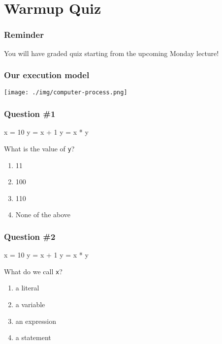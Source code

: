 \documentclass[11pt]{beamer}
\begin{document}
\section{Warmup Quiz}


\begin{frame}
	\frametitle{Reminder}
	\Enlarge
	\begin{itemize}
		\myitem  You will have graded quiz starting from the upcoming Monday lecture!
	\end{itemize}
\end{frame}




\begin{frame}
  \frametitle{Our execution model}
  \texttt{[image: ./img/computer-process.png]}
\end{frame}

\begin{frame}[fragile]
  \frametitle{Question \#1}
  \Enlarge

  \begin{semiverbatim}
x = 10
y = x + 1
y = x * y
  \end{semiverbatim}
  What is the value of \texttt{y}?
  \begin{enumerate}[label=\Alph*]
  \item  11
  \item  100
  \item  110
  \item  None of the above
  \end{enumerate}
\end{frame}

\begin{frame}[fragile]
  \frametitle{Question \#2}
  \Enlarge

  \begin{semiverbatim}
x = 10
y = x + 1
y = x * y
  \end{semiverbatim}
  What do we call \texttt{x}?
  \begin{enumerate}[label=\Alph*]
  \item  a literal
  \item  a variable
  \item  an expression
  \item  a statement
  \end{enumerate}
\end{frame}
\end{document}
